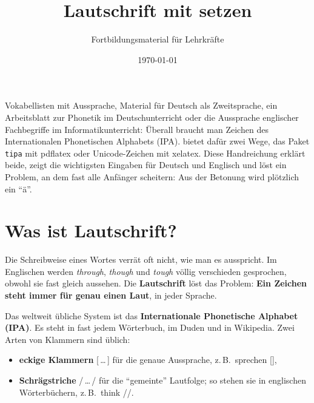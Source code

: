 



\title{Lautschrift mit  setzen}
\author{Fortbildungsmaterial für Lehrkräfte}
\date{\today}
\pagestyle{plain}
\setlength{\parskip}{1.5em} %
\setlength{\emergencystretch}{2em} %




\maketitle

Vokabellisten mit Aussprache, Material für Deutsch als Zweitsprache, ein Arbeitsblatt zur Phonetik im Deutschunterricht oder die Aussprache englischer Fachbegriffe im Informatikunterricht: Überall braucht man Zeichen des Internationalen Phonetischen Alphabets (IPA).  bietet dafür zwei Wege, das Paket \texttt{tipa} mit pdflatex oder Unicode-Zeichen mit xelatex. Diese Handreichung erklärt beide, zeigt die wichtigsten Eingaben für Deutsch und Englisch und löst ein Problem, an dem fast alle Anfänger scheitern: Aus der Betonung  wird plötzlich ein \enquote{ä}.



\section{Was ist Lautschrift?}

Die Schreibweise eines Wortes verrät oft nicht, wie man es ausspricht. Im Englischen werden \textit{through}, \textit{though} und \textit{tough} völlig verschieden gesprochen, obwohl sie fast gleich aussehen. Die \textbf{Lautschrift} löst das Problem: \textbf{Ein Zeichen steht immer für genau einen Laut}, in jeder Sprache.

Das weltweit übliche System ist das \textbf{Internationale Phonetische Alphabet (IPA)}. Es steht in fast jedem Wörterbuch, im Duden und in Wikipedia. Zwei Arten von Klammern sind üblich:

\begin{itemize}
	\item \textbf{eckige Klammern} [\,\dots\,] für die genaue Aussprache, z.\,B.\ sprechen [],
	\item \textbf{Schrägstriche} /\,\dots\,/ für die \enquote{gemeinte} Lautfolge; so stehen sie in englischen Wörterbüchern, z.\,B.\ think //.
\end{itemize}

